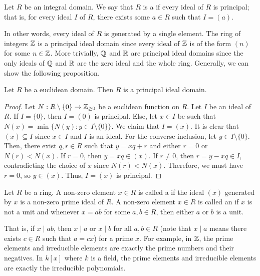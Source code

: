 \begin{definition}
    Let $R$ be an integral domain. We say that $R$ is a  if every ideal of $R$ is principal; that is, for every ideal $I$ of $R$, there exists some $a \in R$ such that $I = (a)$.
\end{definition}

In other words, every ideal of $R$ is generated by a single element. The ring of integers $\mathbb{Z}$ is a principal ideal domain since every ideal of $\mathbb{Z}$ is of the form $(n)$ for some $n \in \mathbb{Z}$. More trivially, $\mathbb{Q}$ and $\mathbb{R}$ are principal ideal domains since the only ideals of $\mathbb{Q}$ and $\mathbb{R}$ are the zero ideal and the whole ring. Generally, we can show the following proposition.

\begin{proposition}
    Let $R$ be a euclidean domain. Then $R$ is a principal ideal domain.
\end{proposition}
\begin{proof}
    Let $N:R\setminus\{0\} \to \mathbb{Z}_{\geq 0}$ be a euclidean function on $R$. Let $I$ be an ideal of $R$. If $I = \{0\}$, then $I = (0)$ is principal. Else, let $x \in I$ be such that $N(x) = \min\{N(y) : y \in I \setminus \{0\}\}$. We claim that $I = (x)$. It is clear that $(x) \subseteq I$ since $x \in I$ and $I$ is an ideal. For the converse inclusion, let $y \in I\setminus\{0\}$. Then, there exist $q,r \in R$ such that $y = xq + r$ and either $r = 0$ or $N(r) < N(x)$. If $r = 0$, then $y = xq \in (x)$. If $r \neq 0$, then $r = y - xq \in I$, contradicting the choice of $x$ since $N(r) < N(x)$. Therefore, we must have $r = 0$, so $y \in (x)$. Thus, $I = (x)$ is principal.
\end{proof}

\begin{definition}
    Let $R$ be a ring. A non-zero element $x \in R$ is called a  if the ideal $(x)$ generated by $x$ is a non-zero prime ideal of $R$. A non-zero element $x \in R$ is called an  if $x$ is not a unit and whenever $x = ab$ for some $a,b \in R$, then either $a$ or $b$ is a unit.
\end{definition}

That is, if $x \mid ab$, then $x \mid a$ or $x \mid b$ for all $a,b \in R$ (note that $x \mid a$ means there exists $c \in R$ such that $a = cx$) for a prime $x$. For example, in $\mathbb{Z}$, the prime elements and irreducible elements are exactly the prime numbers and their negatives. In $k[x]$ where $k$ is a field, the prime elements and irreducible elements are exactly the irreducible polynomials.

